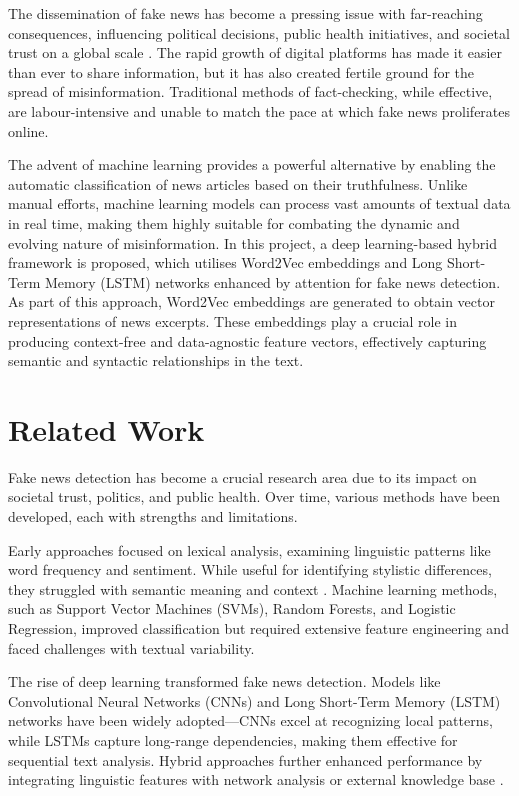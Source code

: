 \documentclass[sn-mathphys-ay, Numbered]{sn-jnl}
\theoremstyle{thmstyleone}%
\theoremstyle{thmstyletwo}%
\theoremstyle{thmstylethree}%
\begin{document}
The dissemination of fake news has become a pressing issue with far-reaching consequences, influencing political decisions, public health initiatives, and societal trust on a global scale \citep{Lazer_2018}. The rapid growth of digital platforms has made it easier than ever to share information, but it has also created fertile ground for the spread of misinformation. Traditional methods of fact-checking, while effective, are labour-intensive and unable to match the pace at which fake news proliferates online.

The advent of machine learning provides a powerful alternative by enabling the automatic classification of news articles based on their truthfulness. Unlike manual efforts, machine learning models can process vast amounts of textual data in real time, making them highly suitable for combating the dynamic and evolving nature of misinformation. In this project, a deep learning-based hybrid framework is proposed, which utilises Word2Vec embeddings and Long Short-Term Memory (LSTM) networks enhanced by attention for fake news detection. As part of this approach, Word2Vec embeddings are generated to obtain vector representations of news excerpts. These embeddings play a crucial role in producing context-free and data-agnostic feature vectors, effectively capturing semantic and syntactic relationships in the text.

\section{Related Work}\label{sec2}

Fake news detection has become a crucial research area due to its impact on societal trust, politics, and public health. Over time, various methods have been developed, each with strengths and limitations.

Early approaches focused on lexical analysis, examining linguistic patterns like word frequency and sentiment. While useful for identifying stylistic differences, they struggled with semantic meaning and context \citep{Perez-Rosas2017}. Machine learning methods, such as Support Vector Machines (SVMs), Random Forests, and Logistic Regression, improved classification but required extensive feature engineering and faced challenges with textual variability.

The rise of deep learning transformed fake news detection. Models like Convolutional Neural Networks (CNNs) and Long Short-Term Memory (LSTM) networks have been widely adopted—CNNs excel at recognizing local patterns, while LSTMs capture long-range dependencies, making them effective for sequential text analysis. Hybrid approaches further enhanced performance by integrating linguistic features with network analysis or external knowledge base \citep{Shu2019}.
\end{document}
